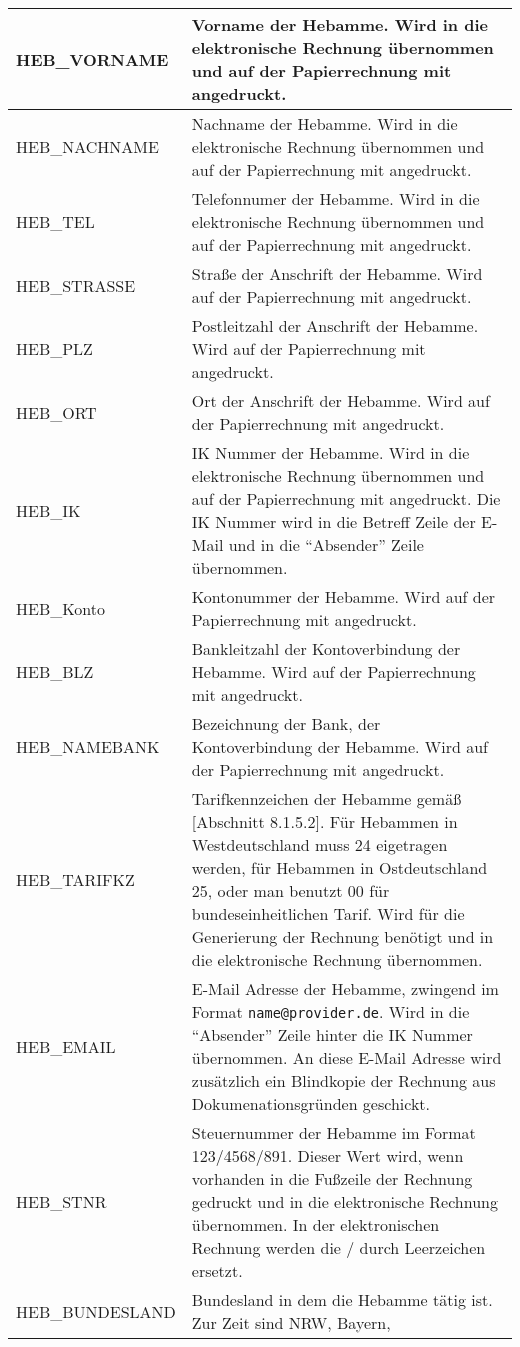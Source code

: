 \tablelasttail{\hline}

\begin{mpsupertabular}{|p{3.9cm}p{9.0cm}|}
HEB\_VORNAME&
Vorname der Hebamme. Wird in die elektronische Rechnung übernommen und
auf der Papierrechnung mit angedruckt.
\tabularnewline\hline
HEB\_NACHNAME&
Nachname der Hebamme. Wird in die elektronische Rechnung übernommen und
auf der Papierrechnung mit angedruckt.
\tabularnewline\hline
HEB\_TEL&
Telefonnumer der Hebamme. Wird in die elektronische Rechnung übernommen und
auf der Papierrechnung mit angedruckt.
\tabularnewline\hline
HEB\_STRASSE&
Straße der Anschrift der Hebamme. Wird auf der Papierrechnung mit angedruckt.
\tabularnewline\hline
HEB\_PLZ&
Postleitzahl der Anschrift der Hebamme. Wird auf der Papierrechnung mit angedruckt.
\tabularnewline\hline
HEB\_ORT&
Ort der Anschrift der Hebamme. Wird auf der Papierrechnung mit angedruckt.
\tabularnewline\hline
HEB\_IK&
IK Nummer der Hebamme. Wird in die elektronische Rechnung übernommen und
auf der Papierrechnung mit angedruckt. Die IK Nummer wird in die Betreff
Zeile der E-Mail und in die ``Absender'' Zeile übernommen.
\tabularnewline\hline
HEB\_Konto&
Kontonummer der Hebamme. Wird auf der Papierrechnung mit angedruckt.
\tabularnewline\hline
HEB\_BLZ&
Bankleitzahl der Kontoverbindung der Hebamme. Wird auf der Papierrechnung
mit angedruckt.
\tabularnewline\hline
HEB\_NAMEBANK&
Bezeichnung der Bank, der Kontoverbindung der Hebamme. Wird auf der
Papierrechnung mit angedruckt.
\tabularnewline\hline
HEB\_TARIFKZ&
Tarifkennzeichen der Hebamme gemäß \cite{schluessel}[Abschnitt 8.1.5.2].
Für Hebammen in Westdeutschland muss 24 eigetragen werden, für Hebammen
in Ostdeutschland 25, oder man benutzt 00 für bundeseinheitlichen Tarif.
Wird für die Generierung der Rechnung benötigt und
in die elektronische Rechnung übernommen.
\tabularnewline\hline
HEB\_EMAIL&
E-Mail Adresse der Hebamme, zwingend im Format \nolinkurl{name@provider.de}.
Wird in die ``Absender'' Zeile hinter die IK Nummer übernommen.
An diese E-Mail Adresse wird zusätzlich ein Blindkopie der Rechnung aus 
Dokumenationsgründen geschickt.
\tabularnewline\hline
HEB\_STNR&
Steuernummer der Hebamme im Format 123/4568/891. Dieser Wert wird, wenn
vorhanden in die Fußzeile der Rechnung gedruckt und in die elektronische
Rechnung übernommen. In der elektronischen Rechnung werden die / durch
Leerzeichen ersetzt.
\tabularnewline\hline
HEB\_BUNDESLAND&
Bundesland in dem die Hebamme tätig ist. Zur Zeit sind NRW, Bayern,

\end{mpsupertabular}
